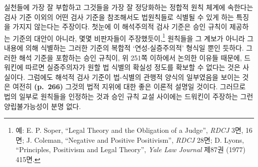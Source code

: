 실천들에 가장 잘 부합하고 그것들을 가장 잘 정당화하는 정합적 원칙 체계에
속한다는 검사 기준 이외의 어떤 검사 기준을 참조해서도 법원칙들로 식별될
수 있게 하는 특징을 가지지 않는다는 주장이다. 첫눈에 이 해석주의적 검사
기준은 승인 규칙이 제공하는 기준의 대안이 아니라, 몇몇 비판자들이
주장했듯이,\footnote{예: E. P. Soper, “Legal Theory and the Obligation
  of a Judge”, \emph{RDCJ} 3면, 16면; J. Coleman, “Negative and
  Positive Positivism”, \emph{RDCJ} 28면; D. Lyons, “Principles,
  Positivism and Legal Theory”, \emph{Yale Law Journal} 제87권 (1977)
  415면.} 원칙들을 그 계보가 아니라 그 내용에 의해 식별하는 그러한
기준의 복합적 ‘연성-실증주의적’ 형식일 뿐인 듯하다. 그러한 해석 기준을
포함하는 승인 규칙이, 위 251쪽 이하에서 논의한 이유들 때문에, 드워킨에
따르면 실증주의자가 원할 법 식별의 확실성 정도를 확보할 수 없다는 것은
사실이다. 그럼에도 해석적 검사 기준이 법-식별의 관행적 양식의 일부였음을
보이는 것은 여전히 \textbf{(p.~266)} 그것의 법적 지위에 대한 좋은 이론적
설명일 것이다. 그러므로 법의 일부로 원칙들을 인정하는 것과 승인 규칙
교설 사이에는 드워킨이 주장하는 그런 양립불가능성이 분명 없다.

